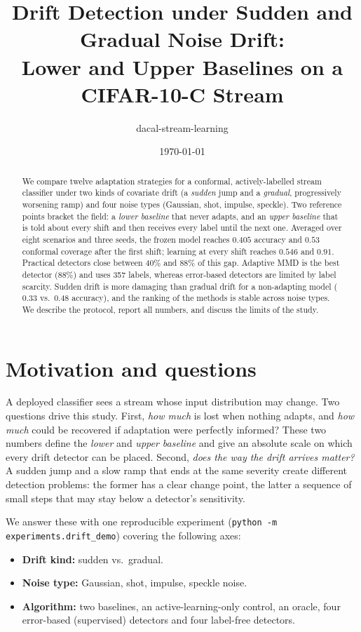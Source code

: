 \documentclass[11pt,a4paper]{article}
\title{Drift Detection under Sudden and Gradual Noise Drift:\\
Lower and Upper Baselines on a CIFAR-10-C Stream}
\author{dacal-stream-learning}
\date{\today}
\begin{document}
\maketitle

\begin{abstract}
We compare twelve adaptation strategies for a conformal, actively-labelled stream classifier
under two kinds of covariate drift (a \emph{sudden} jump and a \emph{gradual}, progressively worsening ramp)
and four noise types (Gaussian, shot, impulse, speckle). Two reference points bracket the field:
a \emph{lower baseline} that never adapts, and an \emph{upper baseline} that is told about every shift and
then receives every label until the next one. Averaged over eight scenarios and three seeds, the frozen
model reaches $0.405$ accuracy and $0.53$ conformal coverage after the first shift; learning at every shift reaches
$0.546$ and $0.91$. Practical detectors close between $40\%$ and $88\%$ of this gap. Adaptive MMD is the best
detector (88\%) and uses 357 labels, whereas error-based detectors are limited by label scarcity.
Sudden drift is more damaging than gradual drift for a non-adapting model ($0.33$ vs.\ $0.48$ accuracy), and the ranking
of the methods is stable across noise types. We describe the protocol, report all numbers, and discuss
the limits of the study.
\end{abstract}

\tableofcontents

\section{Motivation and questions}
\label{sec:intro}

A deployed classifier sees a stream whose input distribution may change. Two questions drive this study.
First, \emph{how much} is lost when nothing adapts, and \emph{how much} could be recovered if adaptation were
perfectly informed? These two numbers define the \emph{lower} and \emph{upper baseline} and give an absolute scale
on which every drift detector can be placed. Second, \emph{does the way the drift arrives matter?}
A sudden jump and a slow ramp that ends at the same severity create different detection problems:
the former has a clear change point, the latter a sequence of small steps that may stay below a
detector's sensitivity.

We answer these with one reproducible experiment (\texttt{python -m experiments.drift\_demo}) covering
the following axes:
\begin{itemize}[nosep]
 \item \textbf{Drift kind:} sudden vs.\ gradual.
 \item \textbf{Noise type:} Gaussian, shot, impulse, speckle noise.
 \item \textbf{Algorithm:} two baselines, an active-learning-only control, an oracle, four error-based (supervised) detectors and four label-free detectors.
\end{itemize}
\end{document}

